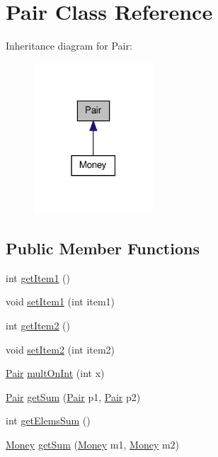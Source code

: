 \hypertarget{class_pair}{
\section{Pair Class Reference}
\label{class_pair}
}


Inheritance diagram for Pair:\nopagebreak
\begin{figure}[H]
\begin{center}
\leavevmode
\includegraphics[width=126pt]{class_pair__inherit__graph}
\end{center}
\end{figure}
\subsection*{Public Member Functions}
\begin{DoxyCompactItemize}
\item 
int \hyperlink{class_pair_a36cddf4637a16d382e8c5c324298cf37}{getItem1} ()
\item 
void \hyperlink{class_pair_afb15f3c33dad273cbe4874b185821b0c}{setItem1} (int item1)
\item 
int \hyperlink{class_pair_acf2e2b2fdd2d7132dd55262e4706e5f4}{getItem2} ()
\item 
void \hyperlink{class_pair_a915698a95a39d54d728920b891679e33}{setItem2} (int item2)
\item 
\hyperlink{class_pair}{Pair} \hyperlink{class_pair_a9d7cd4940dc355fef564a5b1df58a884}{multOnInt} (int x)
\item 
\hyperlink{class_pair}{Pair} \hyperlink{class_pair_a05dfcff34135861c2c062938d7d72f8f}{getSum} (\hyperlink{class_pair}{Pair} p1, \hyperlink{class_pair}{Pair} p2)
\item 
int \hyperlink{class_pair_ad56d0f5fe62b0f2f84ed752bccd66869}{getElemsSum} ()
\item 
\hyperlink{class_money}{Money} \hyperlink{class_pair_a7e90e417eaa888443c0b50902341b6d1}{getSum} (\hyperlink{class_money}{Money} m1, \hyperlink{class_money}{Money} m2)
\end{DoxyCompactItemize}
